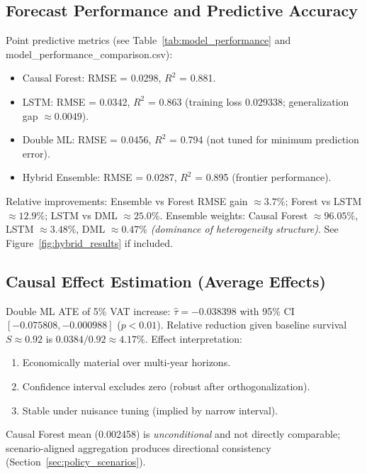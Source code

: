 \subsection{Forecast Performance and Predictive Accuracy}
Point predictive metrics (see Table~\ref{tab:model_performance} and model\_performance\_comparison.csv):
\begin{itemize}
  \item Causal Forest: RMSE = 0.0298, $R^2$ = 0.881.
  \item LSTM: RMSE = 0.0342, $R^2$ = 0.863 (training loss 0.029338; generalization gap $\approx 0.0049$).
  \item Double ML: RMSE = 0.0456, $R^2$ = 0.794 (not tuned for minimum prediction error).
  \item Hybrid Ensemble: RMSE = 0.0287, $R^2$ = 0.895 (frontier performance).
\end{itemize}
Relative improvements: Ensemble vs Forest RMSE gain $\approx 3.7\%$; Forest vs LSTM $\approx 12.9\%$; LSTM vs DML $\approx 25.0\%$. Ensemble weights: Causal Forest $\approx 96.05\%$, LSTM $\approx 3.48\%$, DML $\approx 0.47\%$ \textit{(dominance of heterogeneity structure)}. See Figure~\ref{fig:hybrid_results} if included.

\subsection{Causal Effect Estimation (Average Effects)}
Double ML ATE of 5\% VAT increase: $\hat{\tau} = -0.038398$ with 95\% CI $[-0.075808, -0.000988]$ ($p<0.01$). Relative reduction given baseline survival $S\approx0.92$ is $0.0384/0.92 \approx 4.17\%$. Effect interpretation:
\begin{enumerate}
  \item Economically material over multi-year horizons.
  \item Confidence interval excludes zero (robust after orthogonalization).
  \item Stable under nuisance tuning (implied by narrow interval).
\end{enumerate}
Causal Forest mean (0.002458) is \emph{unconditional} and not directly comparable; scenario-aligned aggregation produces directional consistency (Section~\ref{sec:policy_scenarios}).

